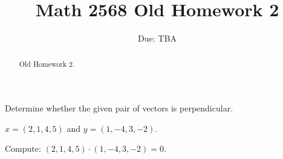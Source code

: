 \documentclass{ximera}
\title{Math 2568 Old Homework 2}
\author{\phantom{Dr. Golubitsky}}
\date{Due: TBA}
\begin{document}
\begin{abstract}
Old Homework 2. 
\end{abstract}
\maketitle


\problemlabel

\noindent Determine whether the given pair of vectors is perpendicular.

\begin{exercise} \label{c1.4.1c}
  $x=(2,1,4,5)$ and $y=(1,-4,3,-2)$.
    \begin{multipleChoice}
  \end{multipleChoice}
  \begin{hint}
    Compute: $(2,1,4,5) \cdot (1,-4,3,-2) = 0$.
  \end{hint}

%
%
\end{exercise}

\problemlabel
\end{document}

